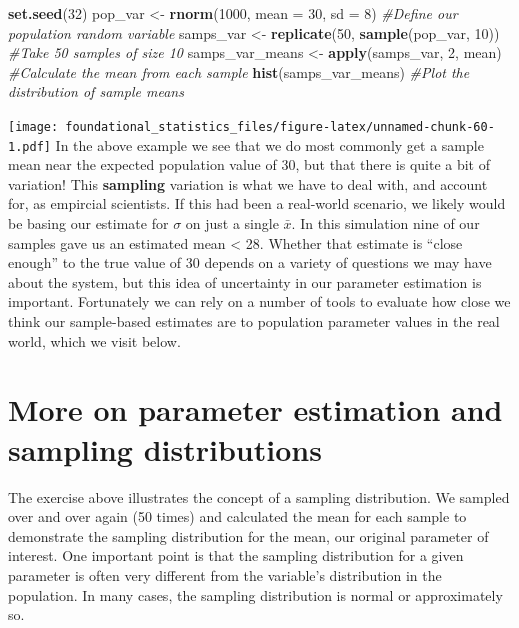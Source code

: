 \documentclass[]{book}
\newenvironment{Shaded}{\begin{snugshade}}{\end{snugshade}}
\newcommand{\CommentTok}[1]{\textcolor[rgb]{0.56,0.35,0.01}{\textit{#1}}}
\newcommand{\DataTypeTok}[1]{\textcolor[rgb]{0.13,0.29,0.53}{#1}}
\newcommand{\DecValTok}[1]{\textcolor[rgb]{0.00,0.00,0.81}{#1}}
\newcommand{\KeywordTok}[1]{\textcolor[rgb]{0.13,0.29,0.53}{\textbf{#1}}}
\newcommand{\NormalTok}[1]{#1}
\newcommand{\StringTok}[1]{\textcolor[rgb]{0.31,0.60,0.02}{#1}}
\begin{document}
\begin{Shaded}
\begin{Highlighting}[]
\KeywordTok{set.seed}\NormalTok{(}\DecValTok{32}\NormalTok{)}
\NormalTok{pop_var <-}\StringTok{ }\KeywordTok{rnorm}\NormalTok{(}\DecValTok{1000}\NormalTok{, }\DataTypeTok{mean =} \DecValTok{30}\NormalTok{, }\DataTypeTok{sd =} \DecValTok{8}\NormalTok{) }\CommentTok{#Define our population random variable}
\NormalTok{samps_var <-}\StringTok{ }\KeywordTok{replicate}\NormalTok{(}\DecValTok{50}\NormalTok{, }\KeywordTok{sample}\NormalTok{(pop_var, }\DecValTok{10}\NormalTok{)) }\CommentTok{#Take 50 samples of size 10}
\NormalTok{samps_var_means <-}\StringTok{ }\KeywordTok{apply}\NormalTok{(samps_var, }\DecValTok{2}\NormalTok{, mean) }\CommentTok{#Calculate the mean from each sample}
\KeywordTok{hist}\NormalTok{(samps_var_means) }\CommentTok{#Plot the distribution of sample means}
\end{Highlighting}
\end{Shaded}

\texttt{[image: foundational\_statistics\_files/figure-latex/unnamed-chunk-60-1.pdf]}
In the above example we see that we do most commonly get a sample mean near the expected population value of 30, but that there is quite a bit of variation! This \textbf{sampling} variation is what we have to deal with, and account for, as empircial scientists. If this had been a real-world scenario, we likely would be basing our estimate for \(\sigma\) on just a single \(\bar{x}\). In this simulation nine of our samples gave us an estimated mean \textless{} 28. Whether that estimate is ``close enough'' to the true value of 30 depends on a variety of questions we may have about the system, but this idea of uncertainty in our parameter estimation is important. Fortunately we can rely on a number of tools to evaluate how close we think our sample-based estimates are to population parameter values in the real world, which we visit below.

\hypertarget{more-on-parameter-estimation-and-sampling-distributions}{%
\section{More on parameter estimation and sampling distributions}\label{more-on-parameter-estimation-and-sampling-distributions}}

The exercise above illustrates the concept of a sampling distribution. We sampled over and over again (50 times) and calculated the mean for each sample to demonstrate the sampling distribution for the mean, our original parameter of interest. One important point is that the sampling distribution for a given parameter is often very different from the variable's distribution in the population. In many cases, the sampling distribution is normal or approximately so.
\end{document}
